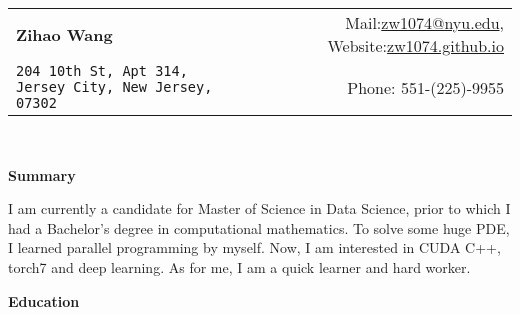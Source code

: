 \documentclass[a4paper,11pt]{article}
\renewcommand{\normalsize}{\fontsize{12pt}{\baselineskip}\selectfont}
\newcommand{\resheading}[1]{{\large \colorbox{mygrey}{\begin{minipage}{\textwidth}{\textbf{#1 \vphantom{p\^{E}}}}\end{minipage}}}}
\begin{document}
	\footnotesize
	\newcommand{\mywebheader}{
		\begin{tabular*}{7in}{l@{\extracolsep{\fill}}r}
			\textbf{\LARGE Zihao Wang} & Mail:\href{mailto:zw1074@nyu.edu}{zw1074@nyu.edu}, Website:\href{zw1074.github.io}{zw1074.github.io}\\
			{\footnotesize \texttt{204 10th St, Apt 314, Jersey City, New Jersey, 07302}
			}
			& Phone: 551-(225)-9955
		\end{tabular*}
		\\
		\vspace{0.1in}}
	
	\mywebheader
	
	\resheading{Summary}
	I am currently a candidate for Master of Science in Data Science, prior to which I had a Bachelor's degree in computational mathematics. To solve some huge PDE, I learned parallel programming by myself. Now, I am interested in CUDA C++, torch7 and deep learning. As for me, I am a quick learner and hard worker. 
	\resheading{Education}
\end{document}
